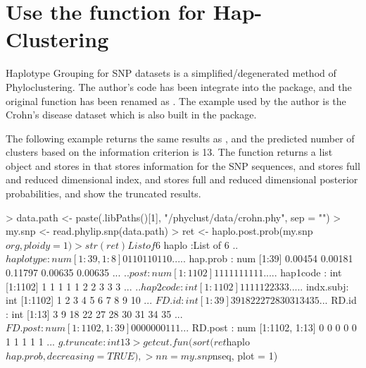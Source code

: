 \section[Use the haplo.post.prob() function for Hap-Clustering]{Use the  function for Hap-Clustering}
\label{sec:haplo}

Haplotype Grouping \citep{tzeng2005} for SNP datasets
is a simplified/degenerated method of Phyloclustering.
The author's code has been integrate into the  package,
and the original function has been renamed as .
The example used by the author is the Crohn's disease dataset
\citep{Hugot2001} which is also built in the package.

The following example returns the same results as \cite{tzeng2005}, and
the predicted number of clusters based on the information criterion is 13.
The function returns a list object and stores in  that
 stores information for the SNP sequences,
 and  stores full and reduced dimensional
index, 
 and  stores full and reduced dimensional
posterior probabilities, and  show the truncated results.
\begin{Code}
> data.path <- paste(.libPaths()[1], "/phyclust/data/crohn.phy", sep = "")
> my.snp <- read.phylip.snp(data.path)
> ret <- haplo.post.prob(my.snp$org, ploidy = 1)
> str(ret)
List of 6
 $ haplo     :List of 6
  ..$ haplotype: num [1:39, 1:8] 0 1 1 0 1 1 0 1 1 0 ...
  ..$ hap.prob : num [1:39] 0.00454 0.00181 0.11797 0.00635 0.00635 ...
  ..$ post     : num [1:1102] 1 1 1 1 1 1 1 1 1 1 ...
  ..$ hap1code : int [1:1102] 1 1 1 1 1 2 2 3 3 3 ...
  ..$ hap2code : int [1:1102] 1 1 1 1 1 2 2 3 3 3 ...
  ..$ indx.subj: int [1:1102] 1 2 3 4 5 6 7 8 9 10 ...
 $ FD.id     : int [1:39] 3 9 18 22 27 28 30 31 34 35 ...
 $ RD.id     : int [1:13] 3 9 18 22 27 28 30 31 34 35 ...
 $ FD.post   : num [1:1102, 1:39] 0 0 0 0 0 0 0 1 1 1 ...
 $ RD.post   : num [1:1102, 1:13] 0 0 0 0 0 1 1 1 1 1 ...
 $ g.truncate: int 13
> getcut.fun(sort(ret$haplo$hap.prob, decreasing = TRUE),
>            nn = my.snp$nseq, plot = 1)
\end{Code}

